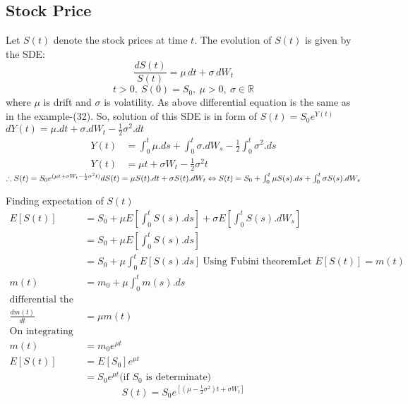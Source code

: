 \documentclass[twoside,final]{hcmut-report}
\begin{document}
        \subsection{Stock Price}
        Let $S(t)$ denote the stock prices at time $t$. The evolution of $S(t)$ is given by the SDE: 
        \[\frac{d S(t)}{S(t)} = \mu\,dt + \sigma\,dW_t\]
        \[t > 0, \ S(0) = S_0, \ \mu > 0, \ \sigma \in \mathbb{R}\]
        where $\mu$ is drift and $\sigma$ is volatility.
        As above differential equation is the same as in the example-(32). So, solution of this SDE is in form of $S(t) = S_0 e^{Y(t)}$\\
$dY(t) = \mu.dt + \sigma.dW_t - \frac{1}{2} \sigma^2.dt$
\begin{align*}
    Y(t) &= \int_0^t \mu.ds + \int_0^t \sigma.dW_s - \frac{1}{2} \int_0^t \sigma^2.ds\\
    Y(t) &= \mu t + \sigma W_t - \frac{1}{2} \sigma^2 t  
\end{align*} 
$\therefore S(t) = S_0 e^{ (\mu t + \sigma W_t - \frac{1}{2} \sigma^2 t)}\\
dS(t) = \mu S(t).dt + \sigma S(t).dW_t \Leftrightarrow
S(t) = S_0 + \int_0^t \mu S(s).ds + \int_0^t \sigma S(s).dW_s $

 Finding expectation of $S(t)$
\begin{align*}
    {E}[S(t)] &= S_0 +  \mu {E}[\int_0^t S(s).ds] + \sigma {E}[\int_0^t S(s).dW_s] \\
    &= S_0 +  \mu {E}[\int_0^t S(s).ds] \\
    &= S_0 + \mu \int_0^t {E}[S(s).ds] \ \text{Using Fubini theorem}
    \text{Let ${E}[S(t)] = m(t)$}\\
    m(t) &= m_0 + \mu \int_0^t m(s).ds\\
    \text{differential the above equation}\\
    \frac{d m(t)}{dt} &= \mu m(t) \\
    \text{On integrating }\\
    m(t) &= m_0 e^{\mu t}\\
    {E}[S(t)] &= {E}[S_0] e^{\mu t} \\
    &= S_0 e^{\mu t} \text{(if $S_0$ is determinate)}
\end{align*}
  \[ S(t) = S_0 e^{[(\mu - \frac{1}{2}\sigma^2)t +\sigma W_t]} \]
  \newpage
\end{document}
